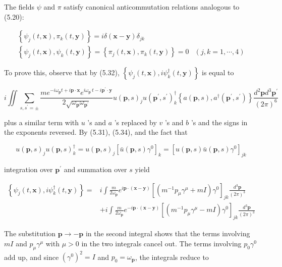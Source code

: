 \documentclass[10pt, letterpaper]{article}
\begin{document}
The fields $\psi$ and $\pi$ satisfy canonical anticommutation relations analogous to (5.20):

$$
\begin{aligned}
\left\{\psi_{j}(t, \mathbf{x}), \pi_{k}(t, \mathbf{y})\right\}=i \delta(\mathbf{x}-\mathbf{y}) \delta_{j k} & \\
\left\{\psi_{j}(t, \mathbf{x}), \psi_{k}(t, \mathbf{y})\right\}=\left\{\pi_{j}(t, \mathbf{x}), \pi_{k}(t, \mathbf{y})\right\}=0 & (j, k=1, \cdots, 4)
\end{aligned}
$$

To prove this, observe that by (5.32), $\left\{\psi_{j}(t, \mathbf{x}), i \psi_{k}^{\dagger}(t, \mathbf{y})\right\}$ is equal to

$$
i \iint \sum_{s, s^{\prime}= \pm} \frac{m e^{-i \omega_{\mathbf{p}} t+i \mathbf{p} \cdot \mathbf{x}} e^{i \omega_{\mathbf{p}^{\prime}} t-i \mathbf{p}^{\prime} \cdot \mathbf{y}}}{2 \sqrt{\omega_{\mathbf{p}} \omega_{\mathbf{p}^{\prime}}}} u(\mathbf{p}, s)_{j} u\left(\mathbf{p}^{\prime}, s^{\prime}\right)_{k}^{\dagger}\left\{a(\mathbf{p}, s), a^{\dagger}\left(\mathbf{p}^{\prime}, s^{\prime}\right)\right\} \frac{d^{2} \mathbf{p} d^{3} \mathbf{p}^{\prime}}{(2 \pi)^{6}}
$$

plus a similar term with $u$ 's and $a$ 's replaced by $v$ 's and $b$ 's and the signs in the exponents reversed. By (5.31), (5.34), and the fact that

$$
u(\mathbf{p}, s)_{j} u(\mathbf{p}, s)_{k}^{\dagger}=u(\mathbf{p}, s)_{j}\left[\bar{u}(\mathbf{p}, s) \gamma^{0}\right]_{k}=\left[u(\mathbf{p}, s) \bar{u}(\mathbf{p}, s) \gamma^{0}\right]_{j k}
$$

integration over $\mathbf{p}^{\prime}$ and summation over $s$ yield

$$
\begin{aligned}
\left\{\psi_{j}(t, \mathbf{x}), i \psi_{k}^{\dagger}(t, \mathbf{y})\right\}= & i \int \frac{m}{2 \omega_{\mathbf{p}}} e^{i \mathbf{p} \cdot(\mathbf{x}-\mathbf{y})}\left[\left(m^{-1} p_{\mu} \gamma^{\mu}+m I\right) \gamma^{0}\right]_{j k} \frac{d^{3} \mathbf{p}}{(2 \pi)^{3}} \\
& +i \int \frac{m}{2 \omega_{\mathbf{p}}} e^{-i \mathbf{p} \cdot(\mathbf{x}-\mathbf{y})}\left[\left(m^{-1} p_{\mu} \gamma^{\mu}-m I\right) \gamma^{0}\right]_{j k} \frac{d^{3} \mathbf{p}}{(2 \pi)^{3}}
\end{aligned}
$$

The substitution $\mathbf{p} \rightarrow-\mathbf{p}$ in the second integral shows that the terms involving $m I$ and $p_{\mu} \gamma^{\mu}$ with $\mu>0$ in the two integrals cancel out. The terms involving $p_{0} \gamma^{0}$ add up, and since $\left(\gamma^{0}\right)^{2}=I$ and $p_{0}=\omega_{\mathbf{p}}$, the integrals reduce to
\end{document}
